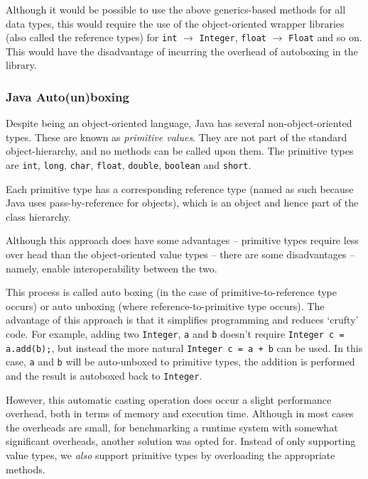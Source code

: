 	Although it would be possible to use the above generics-based methods for all data types, this would require the use of the object-oriented wrapper libraries (also called the reference types) for \texttt{int} $\rightarrow$ \texttt{Integer}, \texttt{float} $\rightarrow$ \texttt{Float} and so on. This would have the disadvantage of incurring the overhead of autoboxing \citep{boxing} in the library.
	
		\subsubsection{Java Auto(un)boxing} \label{sec:runtime/implementation/instrument/boxing}
		Despite being an object-oriented language, Java has several non-object-oriented types. These are known as \textit{primitive values}. They are not part of the standard object-hierarchy, and no methods can be called upon them. The primitive types are \texttt{int}, \texttt{long}, \texttt{char}, \texttt{float}, \texttt{double}, \texttt{boolean} and \texttt{short}.
		
		Each primitive type has a corresponding reference type (named as such because Java uses pass-by-reference for objects), which is an object and hence part of the class hierarchy.
		
		Although this approach does have some advantages -- primitive types require less over head than the object-oriented value types -- there are some disadvantages -- namely, enable interoperability between the two.
		
		This process is called auto boxing (in the case of primitive-to-reference type occurs) or auto unboxing (where reference-to-primitive type occurs). The advantage of this approach is that it simplifies programming and reduces `crufty' code. For example, adding two \texttt{Integer}, \texttt{a} and \texttt{b} doesn't require \texttt{Integer c = a.add(b);}, but instead the more natural \texttt{Integer c = a + b} can be used. In this case, \texttt{a} and \texttt{b} will be auto-unboxed to primitive types, the addition is performed and the result is autoboxed back to \texttt{Integer}.
		
		However, this automatic casting operation does occur a slight performance overhead, both in terms of memory and execution time. Although in most cases the overheads are small, for benchmarking a runtime system with somewhat significant overheads, another solution was opted for. Instead of only supporting value types, we \emph{also} support primitive types by overloading the appropriate methods. 
		
